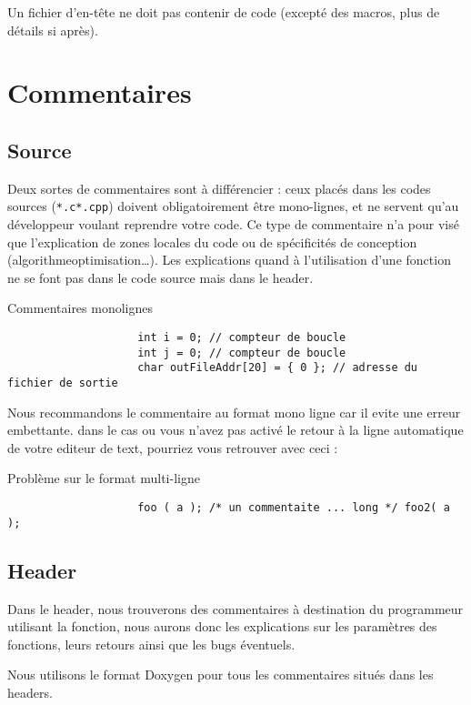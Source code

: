 			Un fichier d'en-tête ne doit pas contenir de code (excepté des macros, plus de détails si après).

	\section{Commentaires}
		\subsection{Source}
			Deux sortes de commentaires sont à différencier : ceux placés dans les codes sources (\verb+*.c+\/\verb+*.cpp+) doivent obligatoirement être mono-lignes, et ne servent qu'au développeur voulant reprendre votre code. Ce type de commentaire n'a pour visé que l'explication de zones locales du code ou de spécificités de conception (algorithme\/optimisation\/\dots). Les explications quand à l'utilisation d'une fonction ne se font pas dans le code source mais dans le header.

			\begin{cbox}{Commentaires monolignes}
				\begin{verbatim}
					int i = 0; // compteur de boucle
					int j = 0; // compteur de boucle
					char outFileAddr[20] = { 0 }; // adresse du fichier de sortie
				\end{verbatim}
			\end{cbox}

			Nous recommandons le commentaire au format mono ligne car il evite une erreur embettante. dans le cas ou vous n'avez pas activé le retour à la ligne automatique de votre editeur de text, pourriez vous retrouver avec ceci :

			\begin{cbox}{Problème sur le format multi-ligne}
				\begin{verbatim}
					foo ( a ); /* un commentaite ... long */ foo2( a );
				\end{verbatim}
			\end{cbox}

			
		\subsection{Header}
			Dans le header, nous trouverons des commentaires à destination du programmeur utilisant la fonction, nous aurons donc les explications sur les paramètres des fonctions, leurs retours ainsi que les bugs éventuels.

			Nous utilisons le format Doxygen pour tous les commentaires situés dans les headers.

